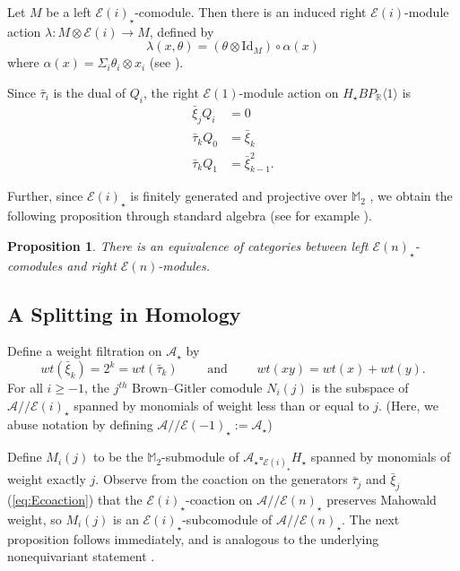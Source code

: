 \documentclass{amsart}
\newtheorem{proposition}[equation]{Proposition}
\theoremstyle{plain}
\numberwithin{equation}{section}
\numberwithin{figure}{section}
\newcommand{\mM}{{\mathbb M}}
\newcommand{\mR}{{\mathbb R}}
\newcommand{\cA}{{\mathcal A}}
\newcommand{\cE}{{\mathcal E}}
\newcommand{\0}{\langle 0 \rangle }
\begin{document}
Let $M$ be a left $\cE(i)_{\star}$-comodule. Then there is an induced right $\cE(i)$-module action $\lambda: M \otimes \cE(i)  \to M$, defined by 
\begin{equation} \label{eq:inducedRightAction}
    \lambda(x,\theta) =  (\theta\otimes \mathrm{Id}_{M}) \circ \alpha(x)
\end{equation}
where $\alpha(x) = \Sigma_{i}\theta_{i} \otimes x_{i}$ (see \cite[\textsection~6]{Boardman82}).

Since $\bar{\tau}_{i}$ is the dual of $Q_{i}$, the right $\mathcal{E} (1)$-module action on $H_\star BP_\mR \langle 1\rangle$ is
\begin{align*}
    \bar{\xi}_{j}Q_i  & = 0 \\
     \bar{\tau}_{k}Q_0  & = \bar{\xi}_{k} \\
     \bar{\tau }_{k}Q_1 &  = \bar{\xi}_{k-1}^2.
\end{align*}

Further, since $\cE(i)_{\star}$ is finitely generated and projective over $\mM_{2}$ \cite{Ricka15}, we obtain the following proposition through standard algebra (see for example \cite[Theorem 4.7]{BrzezinskiWisbauer03}). 
\begin{proposition}\label{prop:equiv of cat}
    There is an equivalence of categories between left $\cE(n)_{\star}$-comodules and right $\cE(n)$-modules.
\end{proposition}

\subsection{A Splitting in Homology}\label{sec:homology splitting}
Define a weight filtration on $\cA_\star$ by 
$$wt(\bar{\xi}_k) = 2^k = wt(\bar{\tau}_k) \qquad \text{ and } \qquad wt(xy) = wt(x) + wt(y).$$ 
For all $i \ge -1$, the $j^{th}$ Brown--Gitler comodule $N_i ( j)$ is the subspace of $\cA//\cE(i)_{\star}$ spanned by monomials of weight less than or equal to $j$. (Here, we abuse notation by defining $\cA//\cE(-1)_{\star} := \cA_{\star}$)  

Define $M_i (j)$ to be the $\mM_{2}$-submodule of $\cA_\star \square_{\mathcal{E} (i)_{\star}} H_\star$ spanned by monomials of weight exactly $j.$ Observe from the coaction on the generators $\bar{\tau}_{j}$ and $\bar{\xi}_{j}$ (\ref{eq:Ecoaction}) that the $\cE(i)_{\star}$-coaction on $\cA//\cE(n)_{\star}$ preserves Mahowald weight, so $M_{i}(j)$ is an $\cE(i)_{\star}$-subcomodule of $\cA//\cE(n)_{\star}$. The next proposition follows immediately, and is analogous to the underlying nonequivariant statement \cite[Proposition~3.3]{Culverp219}. 
\end{document}
